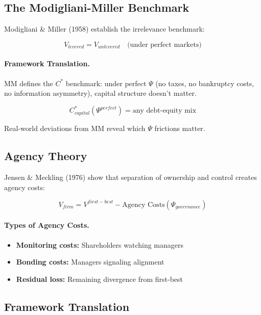 \subsection{The Modigliani-Miller Benchmark}

Modigliani \& Miller (1958) establish the irrelevance benchmark:

\begin{equation}
\boxed{
V_{levered} = V_{unlevered} \quad \text{(under perfect markets)}
}
\label{eq:mm}
\end{equation}

\paragraph{Framework Translation.}
MM defines the $C^*$ benchmark: under perfect $\Psi$ (no taxes, no bankruptcy
costs, no information asymmetry), capital structure doesn't matter.

\begin{equation}
C^*_{capital}(\Psi^{perfect}) = \text{any debt-equity mix}
\end{equation}

Real-world deviations from MM reveal which $\Psi$ frictions matter.

\subsection{Agency Theory}

Jensen \& Meckling (1976) show that separation of ownership and control
creates agency costs:

\begin{equation}
\boxed{
V_{firm} = V^{first-best} - \text{Agency Costs}(\Psi_{governance})
}
\label{eq:agency}
\end{equation}

\paragraph{Types of Agency Costs.}
\begin{itemize}
    \item \textbf{Monitoring costs:} Shareholders watching managers
    \item \textbf{Bonding costs:} Managers signaling alignment
    \item \textbf{Residual loss:} Remaining divergence from first-best
\end{itemize}

\subsection{Framework Translation}

